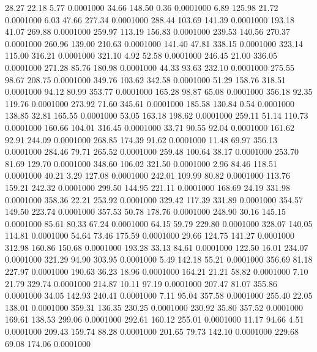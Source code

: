   28.27   22.18    5.77   0.0001000
  34.66  148.50    0.36   0.0001000
   6.89  125.98   21.72   0.0001000
   6.03   47.66  277.34   0.0001000
 288.44  103.69  141.39   0.0001000
 193.18   41.07  269.88   0.0001000
 259.97  113.19  156.83   0.0001000
 239.53  140.56  270.37   0.0001000
 260.96  139.00  210.63   0.0001000
 141.40   47.81  338.15   0.0001000
 323.14  115.00  316.21   0.0001000
 321.10    4.92   52.58   0.0001000
 246.45   21.00  336.05   0.0001000
 271.28   85.76  180.98   0.0001000
  44.33   93.63  232.10   0.0001000
 275.55   98.67  208.75   0.0001000
 349.76  103.62  342.58   0.0001000
  51.29  158.76  318.51   0.0001000
  94.12   80.99  353.77   0.0001000
 165.28   98.87   65.08   0.0001000
 356.18   92.35  119.76   0.0001000
 273.92   71.60  345.61   0.0001000
 185.58  130.84    0.54   0.0001000
 138.85   32.81  165.55   0.0001000
  53.05  163.18  198.62   0.0001000
 259.11   51.14  110.73   0.0001000
 160.66  104.01  316.45   0.0001000
  33.71   90.55   92.04   0.0001000
 161.62   92.91  244.09   0.0001000
 268.85  174.39   91.62   0.0001000
  11.48   69.97  356.13   0.0001000
 284.46   79.71  265.52   0.0001000
 259.48  100.64   38.17   0.0001000
 253.70   81.69  129.70   0.0001000
 348.60  106.02  321.50   0.0001000
   2.96   84.46  118.51   0.0001000
  40.21    3.29  127.08   0.0001000
 242.01  109.99   80.82   0.0001000
 113.76  159.21  242.32   0.0001000
 299.50  144.95  221.11   0.0001000
 168.69   24.19  331.98   0.0001000
 358.36   22.21  253.92   0.0001000
 329.42  117.39  331.89   0.0001000
 354.57  149.50  223.74   0.0001000
 357.53   50.78  178.76   0.0001000
 248.90   30.16  145.15   0.0001000
  85.61   80.33   67.24   0.0001000
  64.15   59.79  229.80   0.0001000
 328.07  140.05  114.81   0.0001000
  54.64   73.46  175.59   0.0001000
  29.66  124.75  141.27   0.0001000
 312.98  160.86  150.68   0.0001000
 193.28   33.13   84.61   0.0001000
 122.50   16.01  234.07   0.0001000
 321.29   94.90  303.95   0.0001000
   5.49  142.18   55.21   0.0001000
 356.69   81.18  227.97   0.0001000
 190.63   36.23   18.96   0.0001000
 164.21   21.21   58.82   0.0001000
   7.10   21.79  329.74   0.0001000
 214.87   10.11   97.19   0.0001000
 207.47   81.07  355.86   0.0001000
  34.05  142.93  240.41   0.0001000
   7.11   95.04  357.58   0.0001000
 255.40   22.05  138.01   0.0001000
 359.31  136.35  230.25   0.0001000
 230.92   35.80  357.52   0.0001000
 169.61  138.53  299.06   0.0001000
 292.61  160.12  255.01   0.0001000
  11.17   94.66    4.51   0.0001000
 209.43  159.74   88.28   0.0001000
 201.65   79.73  142.10   0.0001000
 229.68   69.08  174.06   0.0001000
